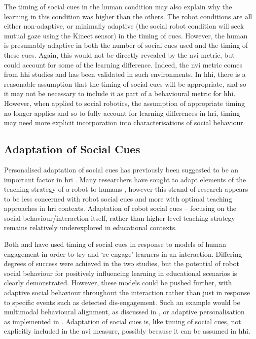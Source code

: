 The timing of social cues in the human condition may also explain why the \gls{learning} in this condition was higher than the others. The robot conditions are all either non-adaptive, or minimally adaptive (the social robot condition will seek mutual gaze using the Kinect sensor) in the timing of cues. However, the human is presumably adaptive in both the number of social cues used and the timing of these cues. Again, this would not be directly revealed by the \acrshort{nvi} metric, but could account for some of the \gls{learning} difference. Indeed, the \acrshort{nvi} metric comes from \acrshort{hhi} studies and has been validated in such environments. In \acrshort{hhi}, there is a reasonable assumption that the timing of social cues will be appropriate, and so it may not be necessary to include it as part of a behavioural metric for \acrshort{hhi}. However, when applied to social robotics, the assumption of appropriate timing no longer applies and so to fully account for \gls{learning} differences in \acrshort{hri}, timing may need more explicit incorporation into characterisations of social behaviour.

\subsection{Adaptation of Social Cues}
Personalised adaptation of social cues has previously been suggested to be an important factor in \acrshort{hri} \citep{dautenhahn2004robots, tapus2008user}. Many researchers have sought to adapt elements of the teaching strategy of a robot to humans \citep{leyzberg2014personalizing, gordon2015bayesian, westlund2015interplay}, however this strand of research appears to be less concerned with robot social cues and more with optimal teaching approaches in \acrshort{hri} contexts. Adaptation of robot social cues -- focusing on the social behaviour/interaction itself, rather than higher-level teaching strategy -- remains relatively underexplored in educational contexts.

Both \cite{szafir2012pay} and \cite{brown2013applying} have used timing of social cues in response to models of human engagement in order to try and `re-engage' learners in an interaction. Differing degrees of success were achieved in the two studies, but the potential of robot social behaviour for positively influencing \gls{learning} in educational scenarios is clearly demonstrated. However, these models could be pushed further, with adaptive social behaviour throughout the interaction rather than just in response to specific events such as detected dis-engagement. Such an example would be multimodal behavioural alignment, as discussed in \cite{baxter2014pervasive}, or adaptive personalisation as implemented in \cite{coninx2015towards}. Adaptation of social cues is, like timing of social cues, not explicitly included in the \acrshort{nvi} measure, possibly because it can be assumed in \acrshort{hhi}.

